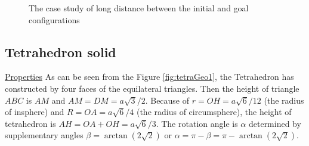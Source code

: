 \begin{center}
\begin{figure}[h]
\hfill
{}
\caption{The case study of long distance between the initial and goal configurations}
\label{fig:cubeLongDist}
\end{figure}
\end{center}
\clearpage
\newpage
\subsection{Tetrahedron solid}
\noindent\uline{Properties} 
As can be seen from the Figure \ref{fig:tetraGeo1}, the Tetrahedron has constructed by four faces of the equilateral triangles. Then the height of triangle $ABC$ is $AM$ and $AM=DM=a\sqrt{3}/2$.
Because of $r=OH=a\sqrt{6}/12$ (the radius of insphere) and $R=OA=a\sqrt{6}/4$ (the radius of circumsphere), the height of tetrahedron is $AH=OA+OH=a\sqrt{6}/3$. The rotation angle is $\alpha$ determined by supplementary angles $\beta=\arctan(2\sqrt{2})$ or $\alpha=\pi-\beta = \pi-\arctan(2\sqrt{2})$.
 
